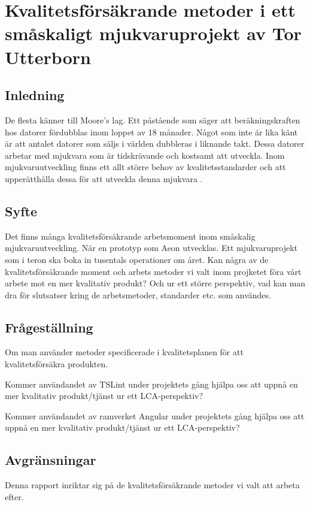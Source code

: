 \chapter{Kvalitetsförsäkrande metoder i ett småskaligt mjukvaruprojekt av Tor Utterborn}

\section{Inledning}

De flesta känner till Moore's lag. Ett påstående som säger att beräkningskraften hos datorer fördubblas inom loppet av 18 månader. 
Något som inte är lika känt är att antalet datorer som säljs i världen dubbleras i liknande takt. \cite{greenbiz}
Dessa datorer arbetar med mjukvara som är tidskrävande och kostsamt att utveckla. Inom mjukvaruutveckling finns ett allt större behov av kvalitetsstandarder och att upperätthålla dessa för att utveckla denna mjukvara \cite{linkedin}.

\section{Syfte}

Det finns många kvalitetsförsäkrande arbetsmoment inom småskalig mjukvaruutveckling. När en prototyp som Aeon utvecklas. Ett mjukvaruprojekt som i teron ska boka in tusentals operationer om året. Kan några av de kvalitetsförsäkrande moment och arbets metoder vi valt inom projketet föra vårt arbete mot en mer kvalitativ produkt? Och ur ett större perspektiv, vad kan man dra för slutsatser kring de arbetsmetoder, standarder etc. som användes.

\section{Frågeställning}

Om man använder metoder specificerade i kvalitetsplanen för att kvalitetsförsäkra produkten. 

Kommer användandet av TSLint under projektets gång hjälpa oss att uppnå en mer kvalitativ produkt/tjänst ur ett LCA-perspektiv?

Kommer användandet av ramverket Angular under projektets gång hjälpa oss att uppnå en mer kvalitativ produkt/tjänst ur ett LCA-perspektiv?

\section{Avgränsningar}
Denna rapport inriktar sig på de kvalitetsförsäkrande metoder vi valt att arbeta efter.

